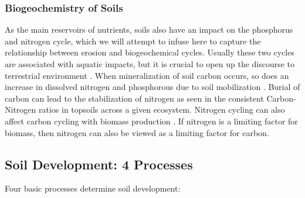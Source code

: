 \subsubsection{Biogeochemistry of Soils}

As the main reservoirs of nutrients, soils also have an impact on the phosphorus and nitrogen cycle, which we will attempt to infuse here to capture the relationship between erosion and biogeochemical cycles. Usually these two cycles are associated with aquatic impacts, but it is crucial to open up the discourse to terrestrial environment \citep{van2007impact}. When mineralization of soil carbon occurs, so does an increase in dissolved nitrogen and phosphorous due to soil mobilization \citep{jacinthe2002carbon}. Burial of carbon can lead to the stabilization of nitrogen as seen in the consistent Carbon-Nitrogen ratios in topsoils across a given ecosystem. Nitrogen cycling can also affect carbon cycling with biomass production \citep{van2006element}. If nitrogen is a limiting factor for biomass, then nitrogen can also be viewed as a limiting factor for carbon.





\subsection{Soil Development: 4 Processes}

Four basic processes determine soil development: 

